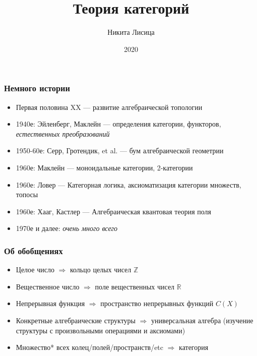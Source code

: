 \documentclass{beamer}
\title{Теория категорий}
\author{Никита Лисица}
\date{2020}
\begin{document}
\frame{\titlepage}

\begin{frame}
\frametitle{Немного истории}
\begin{itemize}
\pause
\item Первая половина XX --- развитие алгебраической топологии
\pause
\item 1940е: Эйленберг, Маклейн --- определения категории, функторов, \textit{естественных преобразований}
\pause
\item 1950-60е: Серр, Гротендик, et al. --- бум алгебраической геометрии
\pause
\item 1960е: Маклейн --- моноидальные категории, 2-категории
\pause
\item 1960е: Ловер --- Категорная логика, аксиоматизация категории множеств, топосы
\pause
\item 1960е: Хааг, Кастлер --- Алгебраическая квантовая теория поля
\pause
\item 1970е и далее: \textit{очень много всего}
\end{itemize}
\end{frame}

\begin{frame}
\frametitle{Об обобщениях}
\begin{itemize}
\pause
\item Целое число \pause \begin{math}\Rightarrow\end{math} кольцо целых чисел \begin{math}\mathbb{Z}\end{math} \pause
\item Вещественное число \pause \begin{math}\Rightarrow\end{math} поле вещественных чисел \begin{math}\mathbb{R}\end{math} \pause
\item Непрерывная функция \pause \begin{math}\Rightarrow\end{math} пространство непрерывных функций \begin{math}C(X)\end{math} \pause
\item Конкретные алгебраические структуры \pause \begin{math}\Rightarrow\end{math} универсальная алгебра (изучение структуры с произвольными операциями и аксиомами) \pause
\item Множество* всех колец/полей/пространств/etc \begin{math}\Rightarrow\end{math}  \pause категория
\end{itemize}
\end{frame}
\end{document}

